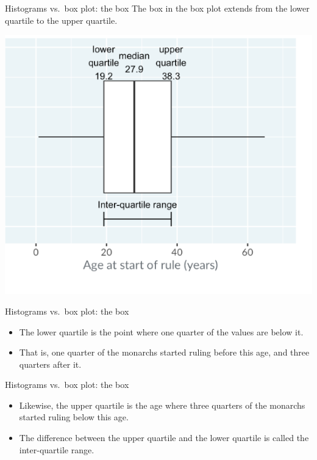 \documentclass[
  ignorenonframetext,
]{beamer}
\begin{document}
\begin{frame}{Histograms vs.~box plot: the box}
\label{histograms-vs.-box-plot-the-box}
The box in the box plot extends from the lower quartile to the upper
quartile.

\includegraphics{../images/im25.png}
\end{frame}

\begin{frame}{Histograms vs.~box plot: the box}
\label{histograms-vs.-box-plot-the-box-1}
\begin{itemize}
\item
  The lower quartile is the point where one quarter of the values are
  below it.
\item
  That is, one quarter of the monarchs started ruling before this age,
  and three quarters after it.
\end{itemize}
\end{frame}

\begin{frame}{Histograms vs.~box plot: the box}
\label{histograms-vs.-box-plot-the-box-2}
\begin{itemize}
\item
  Likewise, the upper quartile is the age where three quarters of the
  monarchs started ruling below this age.
\item
  The difference between the upper quartile and the lower quartile is
  called the inter-quartile range.
\end{itemize}
\end{frame}
\end{document}
